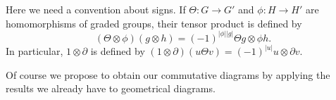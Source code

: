 \documentclass[../main]{subfiles}
\begin{document}
\begin{center}
 {
}
\end{center}

Here we need a convention about signs. If $\Theta : G \rightarrow G'$ and $\phi:H \rightarrow H'$ are homomorphisms of graded groups, their tensor product is defined by $$(\Theta \otimes \phi)(g \otimes h) = (-1)^{|\phi||g|}\Theta g \otimes \phi h.$$  In particular, $1 \otimes \partial$ is defined by $(1 \otimes \partial)(u \Theta v) = (-1)^{|u|}u \otimes \partial v$.

\par Of course we propose to obtain our commutative diagrams by applying the results we already have to geometrical diagrams.
\end{document}
